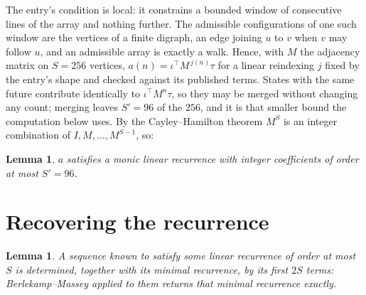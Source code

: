 \documentclass[11pt,a4paper]{article}
\theoremstyle{plain}
\newtheorem{lemma}[theorem]{Lemma}
\theoremstyle{definition}
\begin{document}
The entry's condition is local: it constrains a bounded window of consecutive lines of the
array and nothing further. The admissible configurations of one such window are the vertices
of a finite digraph, an edge joining $u$ to $v$ when $v$ may follow $u$, and an admissible
array is exactly a walk. Hence, with $M$ the adjacency matrix on $S=256$ vertices,
$a(n)=\iota^{\!\top}M^{\,j(n)}\tau$ for a linear reindexing $j$ fixed by the entry's shape
and checked against its published terms. States with the same future contribute identically to $\iota^{\!\top}M^n\tau$, so they may be merged without changing any count; merging leaves $S'=96$ of the $256$, and it is that smaller bound the computation below uses. By the Cayley--Hamilton theorem $M^{S}$ is an
integer combination of $I,M,\dots,M^{S-1}$, so:

\begin{lemma}\label{lem:cf}
$a$ satisfies a monic linear recurrence with integer coefficients of order at most
$S'=96$.
\end{lemma}

\section{Recovering the recurrence}

\begin{lemma}\label{lem:bm}
A sequence known to satisfy some linear recurrence of order at most $S$ is determined, together
with its minimal recurrence, by its first $2S$ terms: Berlekamp--Massey applied to them returns
that minimal recurrence exactly.
\end{lemma}
\end{document}
